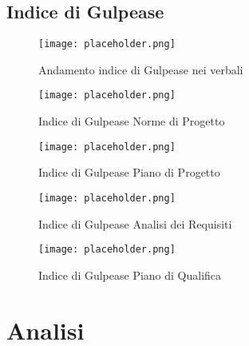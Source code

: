 \newpage

\subsection{Indice di Gulpease}
\label{subsec:Indice di Gulpease}

\begin{figure}[h!] 
    \centering
    \texttt{[image: placeholder.png]}
    \caption{Andamento indice di Gulpease nei verbali} 
    \label{fig: Andamento Gulpease verbali}
\end{figure}

\begin{figure}[h!]
    \centering

    \begin{minipage}{.4\textwidth}
        \centering
        \texttt{[image: placeholder.png]}
        \caption{Indice di Gulpease Norme di Progetto}
        \label{fig:Gulpease Norme Progetto}
    \end{minipage}
    \hfill
    \begin{minipage}{.4\textwidth}
        \centering
        \texttt{[image: placeholder.png]}
        \caption{Indice di Gulpease Piano di Progetto}
        \label{fig:Gulpease Piano Progetto}
    \end{minipage}

\end{figure}

\begin{figure}[H]
    \centering

    \begin{minipage}{.4\textwidth}
        \centering
        \texttt{[image: placeholder.png]}
        \caption{Indice di Gulpease Analisi dei Requisiti}
        \label{fig:Gulpease Analisi Requisiti}
    \end{minipage}%
    \hfill
    \begin{minipage}{.4\textwidth}
        \centering
        \texttt{[image: placeholder.png]}
        \caption{Indice di Gulpease Piano di Qualifica}
        \label{fig:Gulpease Piano Qualifica}
    \end{minipage}

\end{figure}


\section*{Analisi}

